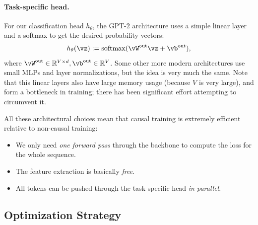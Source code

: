\documentclass[../../book-main.tex]{subfiles}
\begin{document}
\paragraph{Task-specific head.} For our classification head \(h_{\theta}\), the GPT-2 architecture uses a simple linear layer and a softmax to get the desired probability vectors:
\begin{equation}
    h_{\theta}(\vz) := \softmax(\vW^{\out}\vz + \vb^{\out}),
\end{equation}
where \(\vW^{\out} \in \R^{V \times d}, \vb^{\out} \in \R^{V}\). Some other more modern architectures use small MLPs and layer normalizations, but the idea is very much the same. Note that this linear layers also have large memory usage (because \(V\) is very large), and form a bottleneck in training; there has been significant effort attempting to circumvent it.

All these architectural choices mean that causal training is extremely efficient relative to non-causal training:
\begin{itemize}
    \item We only need \textit{one forward pass} through the backbone to compute the loss for the whole sequence.
    \item The feature extraction is basically \textit{free}.
    \item All tokens can be pushed through the task-specific head \textit{in parallel}.
\end{itemize}

\subsection{Optimization Strategy}
\end{document}
